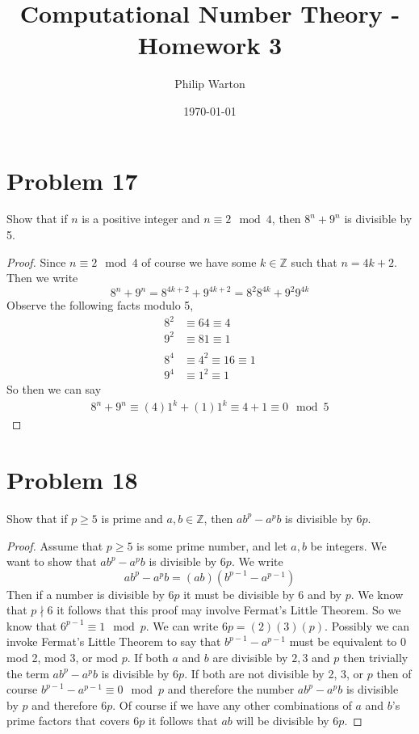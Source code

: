 \documentclass{article}
\theoremstyle{definition}
\begin{document}
\title{Computational Number Theory - Homework 3}
\author{Philip Warton}
\date{\today}
\maketitle
\section*{Problem 17}
\begin{mdframed}[]
    Show that if $n$ is a positive integer and $n \equiv 2 \mod{4}$, then $8^n + 9^n$ is divisible by 5.
\end{mdframed}
\begin{proof}
    Since $n \equiv 2 \mod{4}$ of course we have some $k \in \mathbb{Z}$ such that $n = 4k + 2$.
    Then we write \[8^n + 9^n = 8^{4k + 2} + 9^{4k + 2} = 8^2 8^{4k} + 9^2 9^{4k}\]
    Observe the following facts modulo 5,
    \begin{align}
        8^2 & \equiv 64 \equiv 4 \\
        9^2 & \equiv 81 \equiv 1 \\\\
        8^4 & \equiv 4^2 \equiv 16 \equiv 1 \\
        9^4 & \equiv 1^2 \equiv 1 
    \end{align}
    So then we can say 
    \begin{align}
        8^n + 9^n \equiv (4)1^k + (1)1^k \equiv 4 + 1 \equiv 0 \mod{5}
    \end{align}
\end{proof}
\section*{Problem 18}
\begin{mdframed}
    Show that if $p \geqslant 5$ is prime and $a,b\in\mathbb{Z}$, then $ab^p - a^pb$ is divisible by $6p$.
\end{mdframed}
\begin{proof}
    Assume that $p \geqslant 5$ is some prime number, and let $a, b$ be integers. We want to show that 
    $ab^p -a^pb$ is divisible by $6p$. We write 
    \[
        ab^p - a^pb = (ab)(b^{p-1} - a^{p-1})
    \]
    Then if a number is divisible by $6p$ it must be divisible by 6 and by $p$. We know that $p \nmid 6$ it follows that this 
    proof may involve Fermat's Little Theorem.
    So we know that $6^{p-1} \equiv 1 \mod{p}$. We can write $6p = (2)(3)(p)$.
    Possibly we can invoke Fermat's Little Theorem to say that $b^{p-1} - a^{p-1}$ must be equivalent to 0 mod 2, mod 3, or mod $p$.
    If both $a$ and $b$ are divisible by $2,3$ and $p$ then trivially the term $ab^p - a^pb$ is divisible by $6p$.
    If both are not divisible by 2, 3, or $p$ then of course $b^{p-1} - a^{p-1} \equiv 0 \mod{p}$ and therefore the number
    $ab^p -a^pb$ is divisible by $p$ and therefore $6p$. Of course if we have any other combinations of $a$ and $b$'s prime factors that covers $6p$
    it follows that $ab$ will be divisible by $6p$.
\end{proof}
\end{document}
